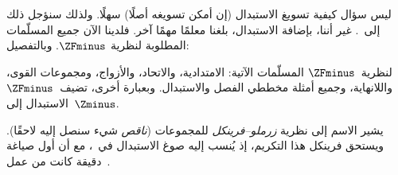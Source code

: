 \documentclass[../../../include/open-logic-section]{subfiles}
\begin{document}

ليس سؤال كيفية تسويغ الاستبدال (إن أمكن تسويغه أصلًا) سهلًا. ولذلك
سنؤجل ذلك إلى~. غير أننا، بإضافة الاستبدال،
بلغنا معلمًا مهمًا آخر. فلدينا الآن جميع المسلّمات المطلوبة لنظرية
$\ZFminus$. وبالتفصيل:

\begin{defn}
لنظرية~$\ZFminus$ المسلّمات الآتية: الامتدادية، والاتحاد، والأزواج،
ومجموعات القوى، واللانهاية، وجميع أمثلة مخططي الفصل والاستبدال.
وبعبارة أخرى، تضيف~$\ZFminus$ الاستبدال إلى~$\Zminus$.
\end{defn}
\noindent
يشير الاسم إلى نظرية \emph{زرملو--فرينكل} للمجموعات (\emph{ناقص}
شيء سنصل إليه لاحقًا). ويستحق فرينكل هذا التكريم، إذ يُنسب إليه صوغ
الاستبدال في~\citeyear{Fraenkel1922}، مع أن أول صياغة دقيقة كانت من
عمل~\citet{Skolem1922}.
\end{document}
